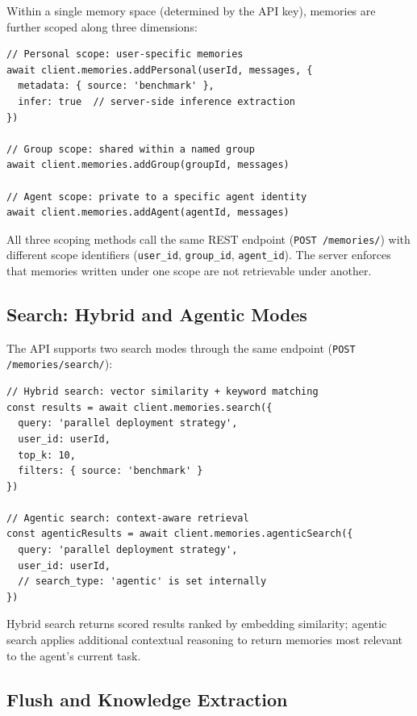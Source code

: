 \documentclass[11pt, a4paper]{article}
\begin{document}
Within a single memory space (determined by the API key), memories are further scoped along three dimensions:

\begin{lstlisting}[caption={Memory scoping API (from \texttt{everos.ts}:124--163)}]
// Personal scope: user-specific memories
await client.memories.addPersonal(userId, messages, {
  metadata: { source: 'benchmark' },
  infer: true  // server-side inference extraction
})

// Group scope: shared within a named group
await client.memories.addGroup(groupId, messages)

// Agent scope: private to a specific agent identity
await client.memories.addAgent(agentId, messages)
\end{lstlisting}

All three scoping methods call the same REST endpoint (\texttt{POST /memories/}) with different scope identifiers (\texttt{user\_id}, \texttt{group\_id}, \texttt{agent\_id}). The server enforces that memories written under one scope are not retrievable under another.

\subsection{Search: Hybrid and Agentic Modes}

The API supports two search modes through the same endpoint (\texttt{POST /memories/search/}):

\begin{lstlisting}[caption={Search modes (from \texttt{everos.ts}:166--185)}]
// Hybrid search: vector similarity + keyword matching
const results = await client.memories.search({
  query: 'parallel deployment strategy',
  user_id: userId,
  top_k: 10,
  filters: { source: 'benchmark' }
})

// Agentic search: context-aware retrieval
const agenticResults = await client.memories.agenticSearch({
  query: 'parallel deployment strategy',
  user_id: userId,
  // search_type: 'agentic' is set internally
})
\end{lstlisting}

Hybrid search returns scored results ranked by embedding similarity; agentic search applies additional contextual reasoning to return memories most relevant to the agent's current task.

\subsection{Flush and Knowledge Extraction}
\end{document}
